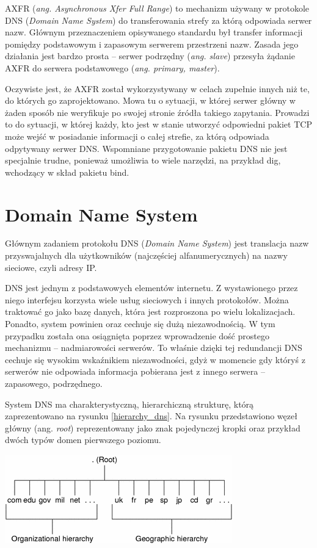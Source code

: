 AXFR (\textit{ang. Asynchronous Xfer Full Range}) to mechanizm używany w protokole DNS (\textit{Domain Name System}) do
transferowania strefy za którą odpowiada serwer nazw. Głównym przeznaczeniem opisywanego standardu był transfer informacji pomiędzy
podstawowym i zapasowym serwerem przestrzeni nazw. Zasada jego działania jest bardzo prosta -- serwer podrzędny (\textit{ang. slave})
przesyła żądanie AXFR do serwera podstawowego (\textit{ang. primary, master}).

Oczywiste jest, że AXFR został wykorzystywany w celach zupełnie innych niż te, do których go zaprojektowano. Mowa tu o sytuacji,
w której serwer główny w żaden sposób nie weryfikuje po swojej stronie źródła takiego zapytania. Prowadzi to do sytuacji, w której
każdy, kto jest w stanie utworzyć odpowiedni pakiet TCP może wejść w posiadanie informacji o całej strefie, za którą odpowiada
odpytywany serwer DNS. Wspomniane przygotowanie pakietu DNS nie jest specjalnie trudne, ponieważ umożliwia to wiele narzędzi, na
przykład dig, wchodzący w skład pakietu bind.

\section{Domain Name System}
Głównym zadaniem protokołu DNS (\textit{Domain Name System}) jest translacja nazw przyswajalnych dla użytkowników (najczęściej
alfanumerycznych) na nazwy sieciowe, czyli adresy IP.

DNS jest jednym z podstawowych elementów internetu. Z wystawionego przez niego interfejsu korzysta wiele usług sieciowych i innych
protokołów. Można traktować go jako bazę danych, która jest rozproszona po wielu lokalizacjach. Ponadto, system powinien oraz
cechuje się dużą niezawodnością. W tym przypadku została ona osiągnięta poprzez wprowadzenie dość prostego mechanizmu -- nadmiarowości
serwerów. To właśnie dzięki tej redundancji DNS cechuje się wysokim wskaźnikiem niezawodności, gdyż w momencie gdy któryś z serwerów
nie odpowiada informacja pobierana jest z innego serwera -- zapasowego, podrzędnego.

System DNS ma charakterystyczną, hierarchiczną strukturę, którą zaprezentowano na rysunku \ref{hierarchy_dns}. Na rysunku
przedstawiono węzeł główny (ang. \textit{root}) reprezentowany jako znak pojedynczej kropki oraz przykład dwóch typów domen
pierwszego poziomu.

\begin{center}
	\includegraphics[scale=1]{image/hierarchy_dns}
	\label{hierarchy_dns}
\end{center}


